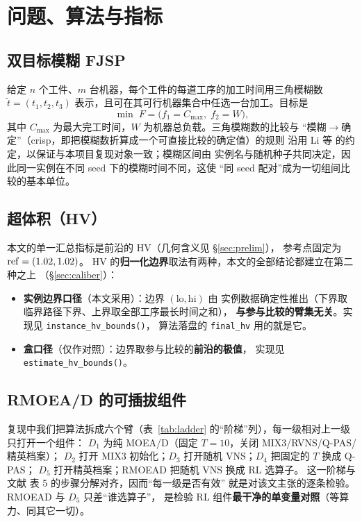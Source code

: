 \documentclass[UTF8, a4paper, 11pt]{ctexart}
\begin{document}
\section{问题、算法与指标}\label{sec:prob}

\subsection{双目标模糊 FJSP}
给定 $n$ 个工件、$m$ 台机器，每个工件的每道工序的加工时间用三角模糊数
$\tilde t=(t_1,t_2,t_3)$ 表示，且可在其可行机器集合中任选一台加工。目标是
\begin{equation}
  \min \; F = \bigl( f_1 = C_{\max},\; f_2 = W \bigr),
\end{equation}
其中 $C_{\max}$ 为最大完工时间，$W$ 为机器总负载。三角模糊数的比较与
“模糊$\to$确定”（crisp，即把模糊数折算成一个可直接比较的确定值）的规则
沿用 Li 等\cite{li2022rmoead} 的约定，以保证与本项目复现对象一致；模糊区间由
实例名与随机种子共同决定，因此同一实例在不同 seed 下的模糊时间不同，这使
“同 seed 配对”成为一切组间比较的基本单位。

\subsection{超体积（HV）}
本文的单一汇总指标是前沿的 HV（几何含义见 \S\ref{sec:prelim}），
参考点固定为 $\mathrm{ref}=(1.02,1.02)$。
HV 的\textbf{归一化边界}取法有两种，本文的全部结论都建立在第二种之上
（\S\ref{sec:caliber}）：
\begin{itemize}\itemsep1pt
  \item \textbf{实例边界口径}（本文采用）：边界 $(\mathrm{lo},\mathrm{hi})$ 由
        实例数据确定性推出（下界取临界路径下界、上界取全部工序最长时间之和），
        \textbf{与参与比较的臂集无关}。实现见 \texttt{instance\_hv\_bounds()}，
        算法落盘的 \texttt{final\_hv} 用的就是它。
  \item \textbf{盒口径}（仅作对照）：边界取参与比较的\textbf{前沿的极值}，
        实现见 \texttt{estimate\_hv\_bounds()}。
\end{itemize}

\subsection{RMOEA/D 的可插拔组件}
复现中我们把算法拆成六个臂（表~\ref{tab:ladder} 的“阶梯”列），每一级相对上一级
只打开一个组件：
$D_1$ 为纯 MOEA/D（固定 $T=10$，关闭 MIX3/RVNS/Q-PAS/精英档案）；
$D_2$ 打开 MIX3 初始化；$D_3$ 打开随机 VNS；$D_4$ 把固定的 $T$ 换成 Q-PAS；
$D_5$ 打开精英档案；\textsf{RMOEAD} 把随机 VNS 换成 RL 选算子。
这一阶梯与文献\cite{li2022rmoead} 表 5 的步骤分解对齐，因而“每一级是否有效”
就是对该文主张的逐条检验。\textsf{RMOEAD} 与 $D_5$ 只差“谁选算子”，
是检验 RL 组件\textbf{最干净的单变量对照}（等算力、同其它一切）。
\end{document}
